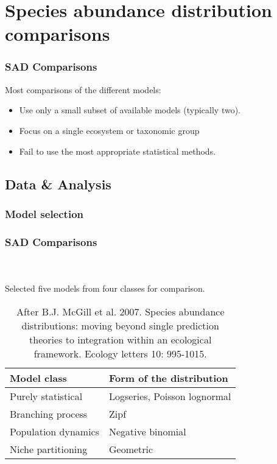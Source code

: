 \documentclass[14pt]{beamer}
\begin{document}
\section{Species abundance distribution comparisons}
\begin{frame}
\frametitle{SAD Comparisons}
\begin{large}
Most comparisons of the different models:
\end{large}
\begin{itemize}
\item Use only a small subset of available models (typically two).
\item Focus on a single ecosystem or taxonomic group
\item Fail to use the most appropriate statistical methods. 
\end{itemize}
\end{frame}

\subsection{Data & Analysis}
\subsubsection{Model selection}
\begin{frame}[shrink=10]
\frametitle{SAD Comparisons}
~\\
~\\
Selected five models from four classes for comparison.
\begin{table}
\begin{tabular}{l|l}
 Model class & Form of the distribution\\ 
\hline
 Purely statistical & Logseries, Poisson lognormal\\
 Branching process & Zipf \\
 Population dynamics & Negative binomial\\
 Niche partitioning & Geometric \\
\end{tabular}
~\\
~\\
~\\
~\\
\caption{After B.J. McGill et al. 2007. Species abundance distributions: moving beyond single prediction theories to integration within an ecological framework. Ecology letters 10: 995-1015.}
\end{table}
\end{frame}
\end{document}
